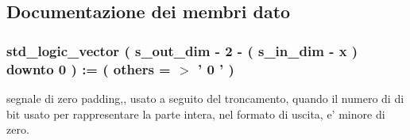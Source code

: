 \subsection{Documentazione dei membri dato}
\hypertarget{classtruncate_1_1dataflow_a130836df2917c4b75d1fc24500082e76}{
\subsubsection[{padding\+\_\+neg}]{ {\bfseries \textcolor{vhdlchar}{std\+\_\+logic\+\_\+vector}\textcolor{vhdlchar}{ }\textcolor{vhdlchar}{(}\textcolor{vhdlchar}{ }\textcolor{vhdlchar}{ }\textcolor{vhdlchar}{ }\textcolor{vhdlchar}{ }{\bfseries {\bf s\+\_\+out\+\_\+dim}} \textcolor{vhdlchar}{-\/}\textcolor{vhdlchar}{ } \textcolor{vhdldigit}{2} \textcolor{vhdlchar}{-\/}\textcolor{vhdlchar}{ }\textcolor{vhdlchar}{(}\textcolor{vhdlchar}{ }\textcolor{vhdlchar}{ }\textcolor{vhdlchar}{ }\textcolor{vhdlchar}{ }{\bfseries {\bf s\+\_\+in\+\_\+dim}} \textcolor{vhdlchar}{-\/}\textcolor{vhdlchar}{ }\textcolor{vhdlchar}{ }\textcolor{vhdlchar}{ }{\bfseries {\bf x}} \textcolor{vhdlchar}{ }\textcolor{vhdlchar}{)}\textcolor{vhdlchar}{ }\textcolor{vhdlchar}{ }\textcolor{vhdlchar}{downto}\textcolor{vhdlchar}{ }\textcolor{vhdlchar}{ } \textcolor{vhdldigit}{0} \textcolor{vhdlchar}{ }\textcolor{vhdlchar}{)}\textcolor{vhdlchar}{ }\textcolor{vhdlchar}{ }\textcolor{vhdlchar}{ }\textcolor{vhdlchar}{\+:}\textcolor{vhdlchar}{=}\textcolor{vhdlchar}{ }\textcolor{vhdlchar}{(}\textcolor{vhdlchar}{ }\textcolor{vhdlchar}{ }\textcolor{vhdlchar}{others}\textcolor{vhdlchar}{ }\textcolor{vhdlchar}{ }\textcolor{vhdlchar}{=}\textcolor{vhdlchar}{ }\textcolor{vhdlchar}{$>$}\textcolor{vhdlchar}{ }\textcolor{vhdlchar}{'}\textcolor{vhdlchar}{ } \textcolor{vhdldigit}{0} \textcolor{vhdlchar}{ }\textcolor{vhdlchar}{'}\textcolor{vhdlchar}{ }\textcolor{vhdlchar}{)}\textcolor{vhdlchar}{ }} \hspace{0.3cm}{\ttfamily [Signal]}}}\label{classtruncate_1_1dataflow_a130836df2917c4b75d1fc24500082e76}


segnale di zero padding,, usato a seguito del troncamento, quando il numero di di bit usato per rappresentare la parte intera, nel formato di uscita, e' minore di zero. 

